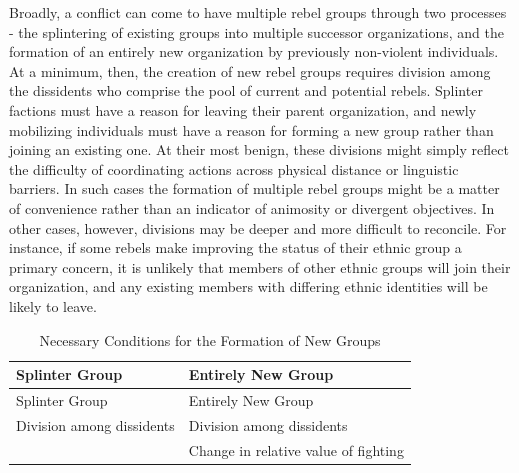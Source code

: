 \documentclass[12pt,]{book}
\begin{document}
Broadly, a conflict can come to have multiple rebel groups through two
processes - the splintering of existing groups into multiple successor
organizations, and the formation of an entirely new organization by
previously non-violent individuals. At a minimum, then, the creation of
new rebel groups requires division among the dissidents who comprise the
pool of current and potential rebels. Splinter factions must have a
reason for leaving their parent organization, and newly mobilizing
individuals must have a reason for forming a new group rather than
joining an existing one. At their most benign, these divisions might
simply reflect the difficulty of coordinating actions across physical
distance or linguistic barriers. In such cases the formation of multiple
rebel groups might be a matter of convenience rather than an indicator
of animosity or divergent objectives. In other cases, however, divisions
may be deeper and more difficult to reconcile. For instance, if some
rebels make improving the status of their ethnic group a primary
concern, it is unlikely that members of other ethnic groups will join
their organization, and any existing members with differing ethnic
identities will be likely to leave.

\begin{longtable}[]{@{}ll@{}}
\caption{Necessary Conditions for the Formation of New
Groups}\tabularnewline
\toprule
Splinter Group & Entirely New Group\tabularnewline
\midrule
\endfirsthead
\toprule
Splinter Group & Entirely New Group\tabularnewline
\midrule
\endhead
Division among dissidents & Division among dissidents\tabularnewline
& Change in relative value of fighting\tabularnewline
\bottomrule
\end{longtable}
\end{document}
